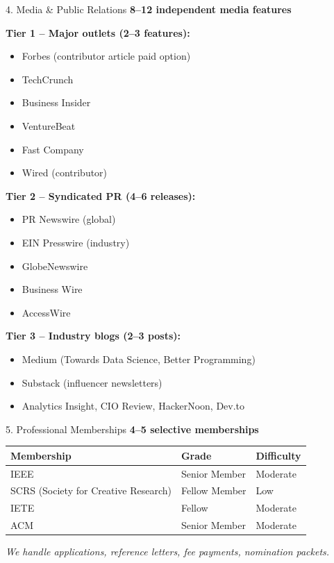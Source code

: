 \documentclass[aspectratio=169, 10pt]{beamer}
\begin{document}
	\begin{frame}{4. Media \& Public Relations}
		\faNewspaper \hspace{0.2cm} \textbf{8–12 independent media features}
		
		\textbf{Tier 1 – Major outlets (2–3 features):}
		\begin{itemize}
			\item Forbes (contributor article paid option)
			\item TechCrunch
			\item Business Insider
			\item VentureBeat
			\item Fast Company
			\item Wired (contributor)
		\end{itemize}
		
		\textbf{Tier 2 – Syndicated PR (4–6 releases):}
		\begin{itemize}
			\item PR Newswire (global)
			\item EIN Presswire (industry)
			\item GlobeNewswire
			\item Business Wire
			\item AccessWire
		\end{itemize}
		
		\textbf{Tier 3 – Industry blogs (2–3 posts):}
		\begin{itemize}
			\item Medium (Towards Data Science, Better Programming)
			\item Substack (influencer newsletters)
			\item Analytics Insight, CIO Review, HackerNoon, Dev.to
		\end{itemize}
	\end{frame}
	
	\begin{frame}{5. Professional Memberships}
		\faUsers \hspace{0.2cm} \textbf{4–5 selective memberships}
		
		\begin{center}
			\small
			\begin{tabular}{lll}
				\toprule
				Membership & Grade & Difficulty \\
				\midrule
				IEEE & Senior Member & Moderate \\
				SCRS (Society for Creative Research) & Fellow Member & Low \\
				IETE & Fellow & Moderate \\
				ACM & Senior Member & Moderate \\
				\bottomrule
			\end{tabular}
		\end{center}
		
		\textit{We handle applications, reference letters, fee payments, nomination packets.}
	\end{frame}
	
\end{document}
